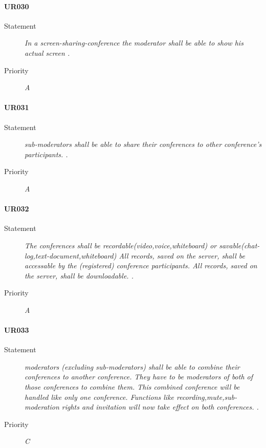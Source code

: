 \paragraph{UR030}
  \begin{description}
  \item [Statement] 
    \textit{ In a screen-sharing-\gls{conference} the \gls{moderator} shall be able to show his actual screen
    .}
  \item [Priority] \textit{A}
\end{description}
    
\paragraph{UR031}
  \begin{description}
  \item [Statement] 
    \textit{ \gls{sub-moderator}s shall be able to share their \gls{conference}s to other \gls{conference}'s participants.
    .}
  \item [Priority] \textit{A}
\end{description}
    
\paragraph{UR032}
  \begin{description}
  \item [Statement] 
    \textit{ The \gls{conference}s shall be recordable(video,voice,whiteboard) or savable(chat-log,text-document,whiteboard)
            All records, saved on the server, shall be accessable by the (registered) \gls{conference} participants.
            All records, saved on the server, shall be downloadable.
    .}
  \item [Priority] \textit{A}
\end{description}
    
\paragraph{UR033}
  \begin{description}
  \item [Statement] 
    \textit{ \gls{moderator}s (excluding \gls{sub-moderator}s) shall be able to combine their \gls{conference}s to another \gls{conference}.
            They have to be \gls{moderator}s of both of those \gls{conference}s to combine them.
            This combined \gls{conference} will be handled like only one \gls{conference}.
            Functions like recording,mute,sub-moderation rights and invitation will now take effect on both \gls{conference}s.
    .}
  \item [Priority] \textit{C}
\end{description}


